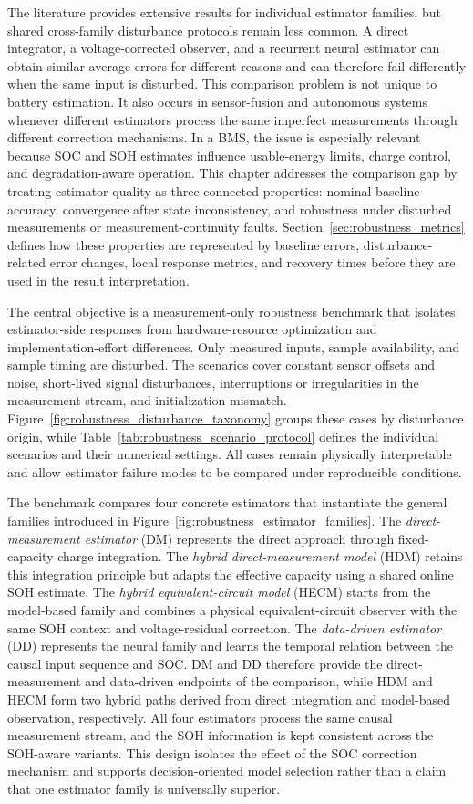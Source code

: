 \documentclass[
    a4paper,
    12pt,
    titlepage,
    bibliography=totoc,
    twoside=on,
    parskip=false,
    numbers=noenddot,
    cleardoublepage=empty,
    DIV=12,
    BCOR=12.0mm,
    headheight=36pt,
    headings=openright
]{scrreprt}
\begin{document}
The literature provides extensive results for individual estimator families, but shared cross-family disturbance protocols remain less common. A direct integrator, a voltage-corrected observer, and a recurrent neural estimator can obtain similar average errors for different reasons and can therefore fail differently when the same input is disturbed. This comparison problem is not unique to battery estimation. It also occurs in sensor-fusion and autonomous systems whenever different estimators process the same imperfect measurements through different correction mechanisms. In a BMS, the issue is especially relevant because SOC and SOH estimates influence usable-energy limits, charge control, and degradation-aware operation. This chapter addresses the comparison gap by treating estimator quality as three connected properties: nominal baseline accuracy, convergence after state inconsistency, and robustness under disturbed measurements or measurement-continuity faults. Section~\ref{sec:robustness_metrics} defines how these properties are represented by baseline errors, disturbance-related error changes, local response metrics, and recovery times before they are used in the result interpretation.

The central objective is a measurement-only robustness benchmark that isolates estimator-side responses from hardware-resource optimization and implementation-effort differences. Only measured inputs, sample availability, and sample timing are disturbed. The scenarios cover constant sensor offsets and noise, short-lived signal disturbances, interruptions or irregularities in the measurement stream, and initialization mismatch. Figure~\ref{fig:robustness_disturbance_taxonomy} groups these cases by disturbance origin, while Table~\ref{tab:robustness_scenario_protocol} defines the individual scenarios and their numerical settings. All cases remain physically interpretable and allow estimator failure modes to be compared under reproducible conditions.

The benchmark compares four concrete estimators that instantiate the general families introduced in Figure~\ref{fig:robustness_estimator_families}. The \emph{direct-measurement estimator} (DM) represents the direct approach through fixed-capacity charge integration. The \emph{hybrid direct-measurement model} (HDM) retains this integration principle but adapts the effective capacity using a shared online SOH estimate. The \emph{hybrid equivalent-circuit model} (HECM) starts from the model-based family and combines a physical equivalent-circuit observer with the same SOH context and voltage-residual correction. The \emph{data-driven estimator} (DD) represents the neural family and learns the temporal relation between the causal input sequence and SOC. DM and DD therefore provide the direct-measurement and data-driven endpoints of the comparison, while HDM and HECM form two hybrid paths derived from direct integration and model-based observation, respectively. All four estimators process the same causal measurement stream, and the SOH information is kept consistent across the SOH-aware variants. This design isolates the effect of the SOC correction mechanism and supports decision-oriented model selection rather than a claim that one estimator family is universally superior.
\end{document}
